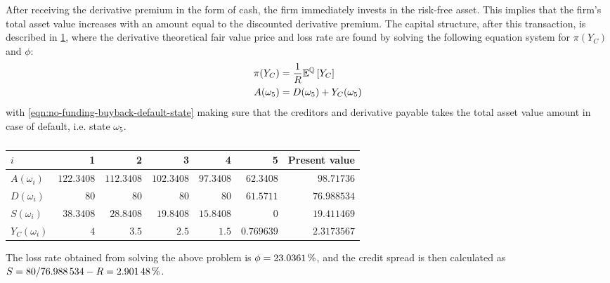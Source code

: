 \documentclass[../main.tex]{subfiles}
\begin{document}
            After receiving the derivative premium in the form of cash, the firm immediately invests in the risk-free asset. 
            This implies that the firm's total asset value increases with an amount equal to the discounted derivative premium. 
            The capital structure, after this transaction, is described in \cref{tbl:example-no-funding-buyback}, 
            where the derivative theoretical fair value price and loss rate are found
            by solving the following equation system for $\pi(Y_C)$ and $\phi$:
            \begin{align}
                \pi(Y_C) &= \frac{1}{R}\mathbb{E}^{\mathbb{Q}}\left[Y_{C}\right]
                \label{eqn:no-funding-buyback-derivative-fair-value}
                \\
                A(\omega_5) &= D(\omega_5) + Y_C(\omega_5)
                \label{eqn:no-funding-buyback-default-state}
            \end{align}
            with \cref{eqn:no-funding-buyback-default-state} making sure that the creditors and derivative payable
            takes the total asset value amount in case of default, i.e. state $\omega_5$.

            \begin{table}[H]
                \centering
                \begin{tabular}{l|rrrrr||r}
                    $i$ & 1 & 2 & 3 & 4 & 5 & Present value \\
                    \hline
                    $A(\omega_{i})$ & $\num{122.3408}$ & $\num{112.3408}$ & $\num{102.3408}$ & $\num{97.3408}$ & $\num{62.3408}$ & $\num{98.71736}$ \\
                    $D(\omega_{i})$ & $\num{80}$ & $\num{80}$ & $\num{80}$ & $\num{80}$ & $\num{61.5711}$ & $\num{76.988534}$ \\
                    $S(\omega_{i})$ & $38.3408$ & $\num{28.8408}$ & $\num{19.8408}$ & $\num{15.8408}$ & $\num{0}$ & $\num{19.411469}$ \\
                    $Y_C(\omega_{i})$ & $\num{4}$ & $\num{3.5}$ & $\num{2.5}$ & $\num{1.5}$ & $\num{0.769639}$ & $\num{2.3173567}$ \\
                \end{tabular}
                \caption{}
                \label{tbl:example-no-funding-buyback}
            \end{table}

            The loss rate obtained from solving the above problem is $\phi = \pct{0.230361}$, and the credit spread is then calculated as $S = \num{80}/\num{76.988534} - \grossrfrate = \pct{0.0290148}$.
\end{document}
